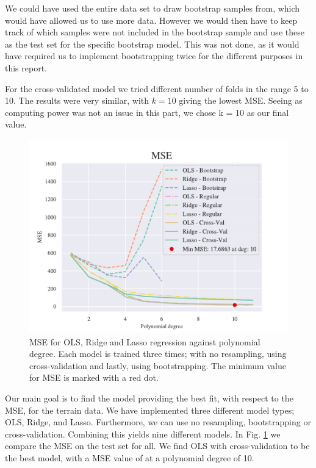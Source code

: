 We could have used the entire data set to draw bootstrap samples from, which would have allowed us to use more data.
However we would then have to keep track of which samples were not included in the bootstrap sample and use these as the test set for the specific bootstrap model. 
This was not done, as it would have required us to implement bootstrapping twice for the different purposes in this report.

For the cross-validated model we tried different number of folds in the range 5 to 10. 
The results were very similar, with $k = 10$ giving the lowest MSE. 
Seeing as computing power was not an issue in this part, we chose k = 10 as our final value. 

\begin{figure}[h!]
    \centering
    \includegraphics[width=1\linewidth]{project_1/figures/figures_in_report/All_terrain.pdf}
    \caption{MSE for OLS, Ridge and Lasso regression against polynomial degree. Each model is trained three times; with no resampling, using cross-validation and lastly, using bootstrapping. The minimum value for MSE is marked with a red dot.}
    \label{all_terrain}
\end{figure}

Our main goal is to find the model providing the best fit, with respect to the MSE, for the terrain data.
We have implemented three different model types; OLS, Ridge, and Lasso. 
Furthermore, we can use no resampling, bootstrapping or cross-validation. 
Combining this yields nine different models. In Fig. \ref{all_terrain} we compare the MSE on the test set for all. 
We find OLS with cross-validation to be the best model, with a MSE value of  at a polynomial degree of 10.

